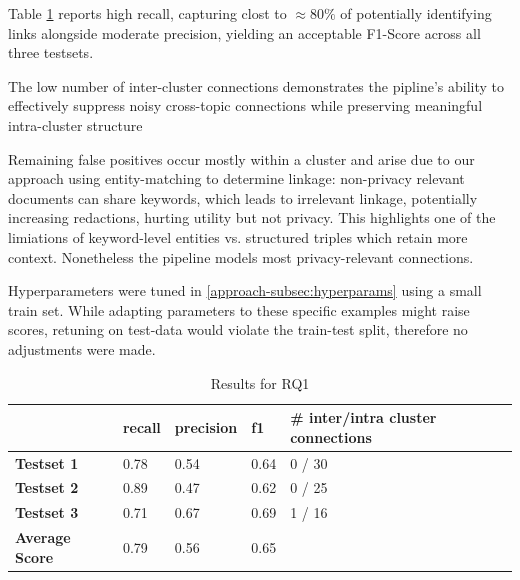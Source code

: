 Table \ref{evaluation-tab:rq0-results} reports high recall, capturing clost to $\approx 80\%$ of potentially identifying links alongside moderate precision, yielding an acceptable F1-Score across all three testsets. 

The low number of inter-cluster connections demonstrates the pipline's ability to effectively suppress noisy cross-topic connections while preserving meaningful intra-cluster structure

Remaining false positives occur mostly within a cluster and arise due to our approach using entity-matching to determine linkage: non-privacy relevant documents can share keywords, which leads to irrelevant linkage, potentially increasing redactions, hurting utility but not privacy. This highlights one of the limiations of keyword-level entities vs. structured triples which retain more context. Nonetheless the pipeline models most privacy-relevant connections.

Hyperparameters were tuned in \ref{approach-subsec:hyperparams} using a small train set. While adapting parameters to these specific examples might raise scores, retuning on test-data would violate the train-test split, therefore no adjustments were made. 

\begin{table}[h!]
\centering
\caption{Results for RQ1}
\label{evaluation-tab:rq0-results}
\begin{tabular}{m{2.5cm} m{2cm} m{2cm} m{2cm} m{3.5cm}}
\toprule
\textbf{} & \textbf{recall} & \textbf{precision} & \textbf{f1} & \textbf{\# inter/intra cluster connections}\\
\midrule
\textbf{Testset 1} & 0.78 & 0.54 & 0.64 & 0 / 30\\
\textbf{Testset 2} & 0.89 & 0.47 & 0.62 & 0 / 25\\
\textbf{Testset 3} & 0.71 & 0.67 & 0.69 & 1 / 16\\
\midrule
\textbf{Average Score} & 0.79 & 0.56 & 0.65 \\
\bottomrule
\end{tabular}
\end{table}





